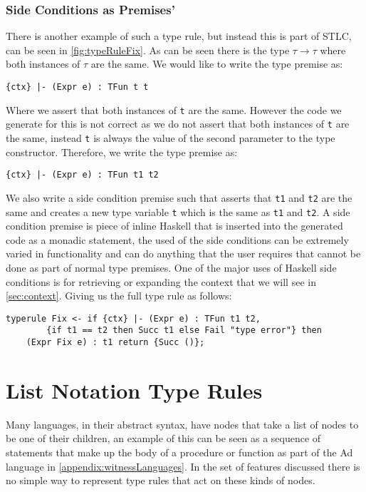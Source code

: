 \subsubsection{Side Conditions as Premises'}
\label{sec:scond}
There is another example of such a type rule, but instead this is part of STLC, can be seen in \autoref{fig:typeRuleFix}.
As can be seen there is the type $\tau \rightarrow \tau$ where both instances of $\tau$ are the same.
We would like to write the type premise as:
\begin{lstlisting}[numbers=none]
{ctx} |- (Expr e) : TFun t t
\end{lstlisting}
Where we assert that both instances of \texttt{t} are the same.
However the code we generate for this is not correct as we do not assert that both instances of \texttt{t} are the same, instead \texttt{t} is always the value of the second parameter to the type constructor.
Therefore, we write the type premise as:
\begin{lstlisting}[numbers=none]
{ctx} |- (Expr e) : TFun t1 t2
\end{lstlisting}
We also write a side condition premise such that asserts that \texttt{t1} and \texttt{t2} are the same and creates a new type variable \texttt{t} which is the same as \texttt{t1} and \texttt{t2}.
A side condition premise is piece of inline Haskell that is inserted into the generated code as a monadic statement, the used of the side conditions can be extremely varied in functionality and can do anything that the user requires that cannot be done as part of normal type premises.
One of the major uses of Haskell side conditions is for retrieving or expanding the context that we will see in \autoref{sec:context}.
Giving us the full type rule as follows:
\begin{lstlisting}
typerule Fix <- if {ctx} |- (Expr e) : TFun t1 t2, 
        {if t1 == t2 then Succ t1 else Fail "type error"} then 
    (Expr Fix e) : t1 return {Succ ()};
\end{lstlisting}

\section{List Notation Type Rules}
Many languages, in their abstract syntax, have nodes that take a list of nodes to be one of their children, an example of this can be seen as a sequence of statements that make up the body of a procedure or function as part of the Ad language in \autoref{appendix:witnessLanguages}.
In the set of features discussed there is no simple way to represent type rules that act on these kinds of nodes.

